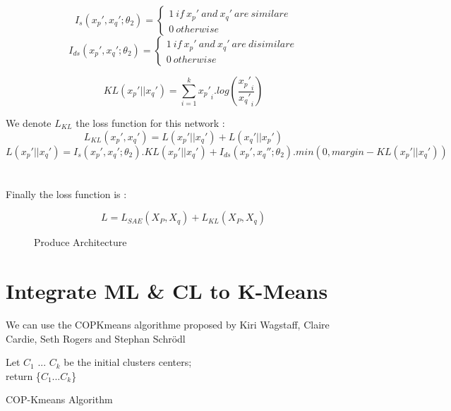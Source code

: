 \documentclass{article}
\begin{document}
\begin{equation}\label{eq:Is}
I_s(x_p', x_q'; \theta_2) = \left\{
    \begin{array}{ll}
        1~if~x_p'~and~x_q'~are~similare \\
        0~otherwise
    \end{array}
\right.
\end{equation}
\begin{equation}\label{eq:Ids}
I_{ds}(x_p', x_q'; \theta_2) = \left\{
    \begin{array}{ll}
        1~if~x_p'~and~x_q'~are~disimilare \\
        0~otherwise
    \end{array}
    \right.
\end{equation}

\begin{equation}\label{eq:KL}
KL(x_p' || x_q') = \sum_{i=1}^k {x_p'}_i . log(\frac{{x_p'}_i}{{x_q'}_i}) 
\end{equation}

We denote $L_{KL}$ the loss function for this network :
\begin{equation}\label{eq:LossKL}
L_{KL}(x_p', x_q') = L(x_p' || x_q') + L(x_q' || x_p') 
\end{equation}
\begin{equation}\label{eq:KLpq}
  L(x_p' || x_q') = I_s(x_p', x_q'; \theta_2) . KL(x_p' || x_q') +
  I_{ds}(x_p', x_q''; \theta_2) . min(0, margin - KL(x_p' || x_q'))
\end{equation}
\\ \\
Finally the loss function is :

\begin{equation}\label{eq:loss_FINALE}
  L = L_{SAE}(X_P, X_q) + L_{KL}(X_P, X_q)
\end{equation}

\begin{figure}[!t]
  \centering
  
  \caption{Produce Architecture}
  \label{fig:final_archi}
\end{figure}
\section{Integrate ML \& CL to K-Means}

We can use the COPKmeans algorithme proposed by Kiri Wagstaff, Claire
Cardie, Seth Rogers and Stephan Schr\"odl
\cite{Wagstaff:2001:CKC:645530.655669} 

\begin{algorithm}[H]
  Let $C_1$ ... $C_k$ be the initial clusters centers;\\
  return \{$C_1$...$C_k$\}
 \caption{COP-Kmeans Algorithm}
\end{algorithm} 
\nocite{*}
\printbibliography[title=References]
\end{document}
